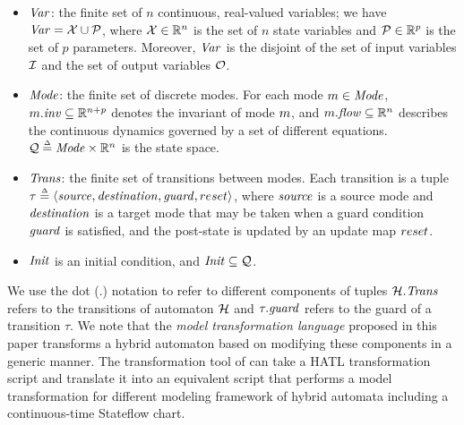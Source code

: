 %
\begin{itemize}[leftmargin= 2em]
%
\item ${\mathit{Var}}$: the finite set of $n$ continuous, real-valued variables; we have ${\mathit{Var}} = {\mathcal X} \cup {\mathcal P}$, where ${\mathcal X} \in \mathbb{R}^n$ is the set of $n$ state variables and ${\mathcal P}\in\mathbb{R}^p$ is the set of $p$ parameters. Moreover, ${\mathit{Var}}$ is the disjoint of the set of input variables ${\mathcal I}$ and the set of output variables ${\mathcal O}$.
\item ${\mathit{Mode}}$: the finite set of discrete modes. For each mode $m \in {\mathit{Mode}}$, $m.{\mathit{inv}} \subseteq \mathbb{R}^{n+p}$ denotes the invariant of mode $m$, and $m.{\mathit{flow}} \subseteq \mathbb{R}^n$ describes the continuous dynamics governed by a set of different equations. ${\mathcal Q} \mathrel{\stackrel{\scriptscriptstyle\Delta}{=}} {\mathit{Mode}} \times \mathbb{R}^n$ is the state space.
\item ${\mathit{Trans}}$: the finite set of transitions between modes.
%
Each transition is a tuple $\tau \mathrel{\stackrel{\scriptscriptstyle\Delta}{=}} \left\langle\mathit{source}, \mathit{destination}, \mathit{guard}, reset\right\rangle$, where $\mathit{source}$ is a source mode and $\mathit{destination}$ is a target mode that may be taken when a guard condition $\mathit{guard}$ is satisfied, and the post-state is updated by an update map $reset$. 
%
%
%
\item ${\mathit{Init}}$ is an initial condition, and ${\mathit{Init}} \subseteq {\mathcal Q}$.
\end{itemize}
%
We use the dot (.) notation to refer to different components of tuples \eg ${\mathcal H}.{\mathit{Trans}}$ refers to the transitions of automaton ${\mathcal H}$ and $\tau.\mathit{guard}$ refers to the guard of a transition $\tau$. %
%
We note that the \emph{model transformation language} proposed in this paper transforms a hybrid automaton based on modifying these components in a generic manner. The transformation tool of \toolreaffirm can take a HATL transformation script and translate it into an equivalent script that performs a model transformation for different modeling framework of hybrid automata including a continuous-time Stateflow chart.
%

